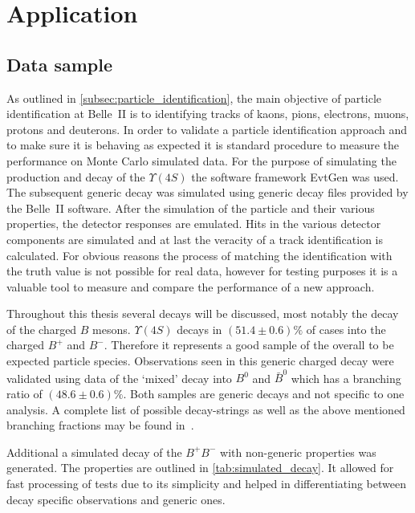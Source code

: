 \chapter{Application}
\label{chap:application}

\section{Data sample}
\label{sec:data_sample}

As outlined in \autoref{subsec:particle_identification}, the main objective of particle identification at Belle~\RN{2} is to identifying tracks of kaons, pions, electrons, muons, protons and deuterons. In order to validate a particle identification approach and to make sure it is behaving as expected it is standard procedure to measure the performance on Monte Carlo simulated data. For the purpose of simulating the production and decay of the $\Upsilon(4S)$ the software framework EvtGen was used. The subsequent generic decay was simulated using generic decay files provided by the Belle~\RN{2} software. After the simulation of the particle and their various properties, the detector responses are emulated. Hits in the various detector components are simulated and at last the veracity of a track identification is calculated. For obvious reasons the process of matching the identification with the truth value is not possible for real data, however for testing purposes it is a valuable tool to measure and compare the performance of a new approach.

Throughout this thesis several decays will be discussed, most notably the decay of the charged $B$ mesons. $\Upsilon(4S)$ decays in $(51.4 \pm 0.6) \%$ of cases into the charged $B^+$ and $B^-$. Therefore it represents a good sample of the overall to be expected particle species. Observations seen in this generic charged decay were validated using data of the `mixed' decay into $B^0$ and $\bar{B}^0$ which has a branching ratio of $(48.6 \pm 0.6) \%$. Both samples are generic decays and not specific to one analysis. A complete list of possible decay-strings as well as the above mentioned branching fractions may be found in~\cite{Patrignani:2016xqp}.

Additional a simulated decay of the $B^+ B^-$ with non-generic properties was generated. The properties are outlined in \autoref{tab:simulated_decay}. It allowed for fast processing of tests due to its simplicity and helped in differentiating between decay specific observations and generic ones.

